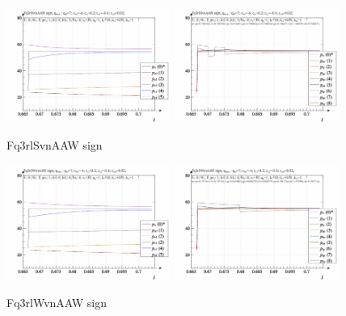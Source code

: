 \documentclass[a4paper,10pt]{article}
\begin{document}
\vspace{-3ex}


\begin{figure}[htb!]
  \centerline{
    \includegraphics[width=0.48\textwidth]{qls-p_t_pi_m_Fq3rlSvnAAW_sign.png}
    \hfill
    \includegraphics[width=0.48\textwidth]{qls-p_t_p_m_Fq3rlSvnAAW_sign.png}
  }
  \caption{Fq3rlSvnAAW sign}
  \label{atu:fig3}
\end{figure}


\vspace{-3ex}

\begin{figure}[htb!]
  \centerline{
    \includegraphics[width=0.48\textwidth]{qls-p_t_pi_m_Fq3rlWvnAAW_sign.png}
    \hfill
    \includegraphics[width=0.48\textwidth]{qls-p_t_p_m_Fq3rlWvnAAW_sign.png}
  }
  \caption{Fq3rlWvnAAW sign}
  \label{atu:fig4}
\end{figure}
\end{document}
